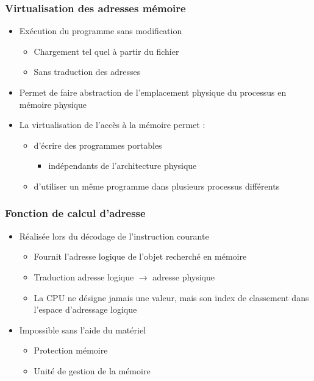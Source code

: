 \begin{frame}
\frametitle{Virtualisation des adresses mémoire}
\begin{itemize}
\item <1>Exécution du programme sans modification
\begin{itemize}
\item Chargement tel quel à partir du fichier
\item Sans traduction des adresses
\end{itemize}

\item <2>Permet de faire abstraction de l’emplacement physique du processus en mémoire physique
\item <3>La virtualisation de l’accès à la mémoire permet :
\begin{itemize}
\item d’écrire des programmes portables
\begin{itemize}
\item indépendants de l’architecture physique
\end{itemize}

\item d'utiliser un même programme dans plusieurs processus différents
\end{itemize}
\end{itemize}
\end{frame}

\begin{frame}
\frametitle{Fonction de calcul d’adresse}
\begin{itemize}
\item <1>Réalisée lors du décodage de l’instruction courante
\begin{itemize}
\item Fournit l’adresse logique de l’objet recherché en mémoire
\item Traduction adresse logique $\rightarrow$ adresse physique
\item La CPU ne désigne jamais une valeur, mais son index de classement dans l’espace d’adressage logique
\end{itemize}
\item <2>Impossible sans l'aide du matériel
\begin{itemize}
\item Protection mémoire
\item Unité de gestion de la mémoire
\end{itemize}
\end{itemize}
\end{frame}


